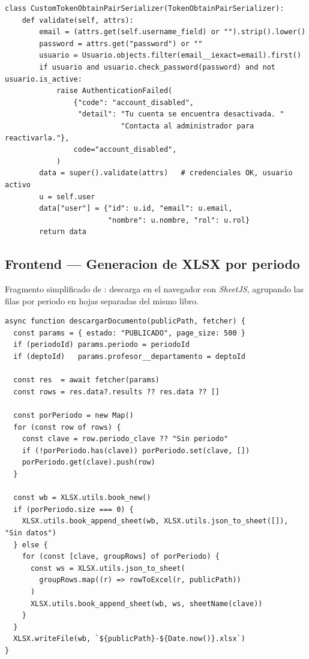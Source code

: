 \begin{Verbatim}[fontsize=\small, frame=single]
class CustomTokenObtainPairSerializer(TokenObtainPairSerializer):
    def validate(self, attrs):
        email = (attrs.get(self.username_field) or "").strip().lower()
        password = attrs.get("password") or ""
        usuario = Usuario.objects.filter(email__iexact=email).first()
        if usuario and usuario.check_password(password) and not usuario.is_active:
            raise AuthenticationFailed(
                {"code": "account_disabled",
                 "detail": "Tu cuenta se encuentra desactivada. "
                           "Contacta al administrador para reactivarla."},
                code="account_disabled",
            )
        data = super().validate(attrs)   # credenciales OK, usuario activo
        u = self.user
        data["user"] = {"id": u.id, "email": u.email,
                        "nombre": u.nombre, "rol": u.rol}
        return data
\end{Verbatim}

\subsection{Frontend --- Generacion de XLSX por periodo}\label{lst:xlsx_por_periodo}

Fragmento simplificado de : descarga en el navegador con \emph{SheetJS}, agrupando las filas por periodo en hojas separadas del mismo libro.

\begin{Verbatim}[fontsize=\small, frame=single]
async function descargarDocumento(publicPath, fetcher) {
  const params = { estado: "PUBLICADO", page_size: 500 }
  if (periodoId) params.periodo = periodoId
  if (deptoId)   params.profesor__departamento = deptoId

  const res  = await fetcher(params)
  const rows = res.data?.results ?? res.data ?? []

  const porPeriodo = new Map()
  for (const row of rows) {
    const clave = row.periodo_clave ?? "Sin periodo"
    if (!porPeriodo.has(clave)) porPeriodo.set(clave, [])
    porPeriodo.get(clave).push(row)
  }

  const wb = XLSX.utils.book_new()
  if (porPeriodo.size === 0) {
    XLSX.utils.book_append_sheet(wb, XLSX.utils.json_to_sheet([]), "Sin datos")
  } else {
    for (const [clave, groupRows] of porPeriodo) {
      const ws = XLSX.utils.json_to_sheet(
        groupRows.map((r) => rowToExcel(r, publicPath))
      )
      XLSX.utils.book_append_sheet(wb, ws, sheetName(clave))
    }
  }
  XLSX.writeFile(wb, `${publicPath}-${Date.now()}.xlsx`)
}
\end{Verbatim}


